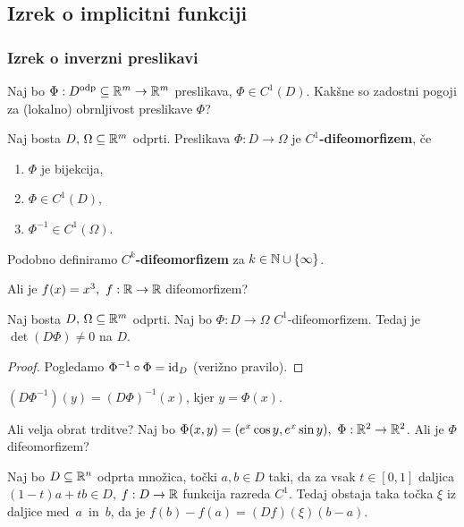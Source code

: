 \subsection{Izrek o implicitni funkciji}
\subsubsection{Izrek o inverzni preslikavi}
Naj bo $\Phi: D^\text{odp} \subseteq \mathbb{R}^m \to \mathbb{R}^m$ preslikava, $\Phi \in C^1(D)$. Kakšne so zadostni pogoji za (lokalno) obrnljivost preslikave $\Phi$?
\begin{definicija}
    Naj bosta $D, \, \Omega \subseteq \mathbb{R}^m$ odprti. Preslikava $\Phi: D  \to \Omega$ je \textbf{$C^1$-difeomorfizem}, če
    \begin{enumerate}
        \item $\Phi$ je bijekcija, 
        \item $\Phi \in C^1(D)$,
        \item $\Phi^{-1} \in C^1(\Omega)$.
    \end{enumerate} 
    Podobno definiramo \textbf{$C^k$-difeomorfizem} za $k \in \mathbb{N} \cup \left\{\infty\right\}$.
\end{definicija}

\begin{zgled}
    Ali je $f(x) = x^3, \ f: \mathbb{R} \to \mathbb{R}$ difeomorfizem?
\end{zgled}

\begin{trditev}
    Naj bosta $D, \, \Omega \subseteq \mathbb{R}^m$ odprti. Naj bo $\Phi: D  \to \Omega$ $C^1$-difeomorfizem. Tedaj je $\det(D\Phi) \neq 0$ na $D$. 
\end{trditev}

\begin{proof}
    Pogledamo $\Phi^{-1} \circ \Phi = \operatorname{id}_D$ (verižno pravilo).
\end{proof}

\begin{posledica}
    $(D\Phi^{-1})(y) = (D\Phi)^{-1}(x)$, kjer $y = \Phi(x)$.
\end{posledica}

\begin{zgled}
    Ali velja obrat trditve? 
    Naj bo $\Phi(x,y) = (e^x \cos y, e^x \sin y), \ \Phi: \mathbb{R}^2 \to \mathbb{R}^2$. Ali je $\Phi$ difeomorfizem?
\end{zgled}

\begin{lema}
    Naj bo $D \subseteq \mathbb{R}^n$ odprta množica, točki $a, b \in D$ taki, da za vsak $t \in [0,1]$ daljica $(1-t)a + tb \in D$, $f: D \to \mathbb{R}$ funkcija razreda $C^1$.     
    Tedaj obstaja taka točka $\xi$ iz daljice med~$a$~in~$b$, da je $f(b)-f(a) = (Df)(\xi)(b-a)$.
\end{lema}

